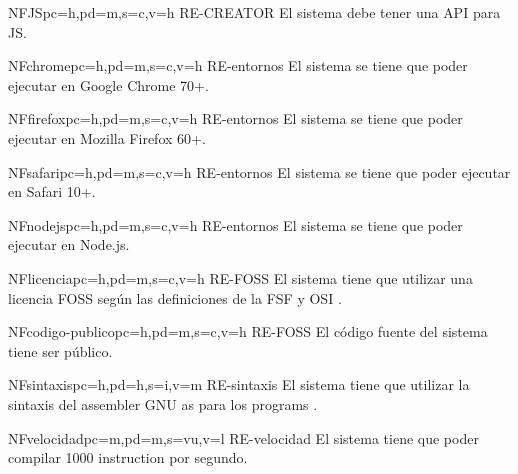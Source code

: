\begin{softwareReq}{NF}{JS}{pc=h,pd=m,s=c,v=h}
    {RE-CREATOR}
    El sistema debe tener una \gls{API} para \gls{JS}.
\end{softwareReq}

\begin{softwareReq}{NF}{chrome}{pc=h,pd=m,s=c,v=h}
    {RE-entornos}
    El sistema se tiene que poder ejecutar en Google Chrome 70+.
\end{softwareReq}

\begin{softwareReq}{NF}{firefox}{pc=h,pd=m,s=c,v=h}
    {RE-entornos}
    El sistema se tiene que poder ejecutar en Mozilla Firefox 60+.
\end{softwareReq}

\begin{softwareReq}{NF}{safari}{pc=h,pd=m,s=c,v=h}
    {RE-entornos}
    El sistema se tiene que poder ejecutar en Safari 10+.
\end{softwareReq}

\begin{softwareReq}{NF}{nodejs}{pc=h,pd=m,s=c,v=h}
    {RE-entornos}
    El sistema se tiene que poder ejecutar en Node.js.
\end{softwareReq}

\begin{softwareReq}{NF}{licencia}{pc=h,pd=m,s=c,v=h}
    {RE-FOSS}
    El sistema tiene que utilizar una licencia \gls{FOSS} según las definiciones
    de la \gls{FSF} \parencite{FreeSoftware} y \gls{OSI} \parencite{OpenSource}.
\end{softwareReq}

\begin{softwareReq}{NF}{codigo-publico}{pc=h,pd=m,s=c,v=h}
    {RE-FOSS}
    El código fuente del sistema tiene ser público.
\end{softwareReq}

\begin{softwareReq}{NF}{sintaxis}{pc=h,pd=h,s=i,v=m}
    {RE-sintaxis}
    El sistema tiene que utilizar la sintaxis del \gls{assembler} GNU as
    \parencite{as-manual} para los \glspl{program} .
\end{softwareReq}

\begin{softwareReq}{NF}{velocidad}{pc=m,pd=m,s=vu,v=l}
    {RE-velocidad}
    El sistema tiene que poder compilar 1000 \gls{instruction} por segundo.
\end{softwareReq}

